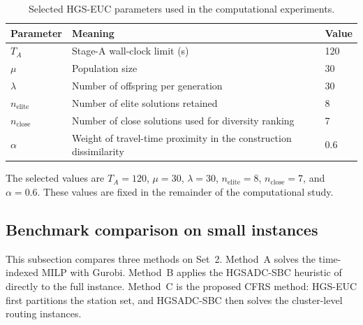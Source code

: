 \begin{table}[t]
  \centering
  \caption{Selected HGS-EUC parameters used in the computational experiments.}
  \label{tab:stage-a-params}
  \begin{tabular}{lll}
    \toprule
    Parameter & Meaning & Value \\
    \midrule
    $T_A$ & Stage-A wall-clock limit (s) & 120 \\
    $\mu$ & Population size & 30 \\
    $\lambda$ & Number of offspring per generation & 30 \\
    $n_{\mathrm{elite}}$ & Number of elite solutions retained & 8 \\
    $n_{\mathrm{close}}$ & Number of close solutions used for diversity ranking & 7 \\
    $\alpha$ & Weight of travel-time proximity in the construction dissimilarity & 0.6 \\
    \bottomrule
  \end{tabular}
\end{table}

The selected values are $T_A=120$, $\mu=30$, $\lambda=30$,
$n_{\mathrm{elite}}=8$, $n_{\mathrm{close}}=7$, and $\alpha=0.6$. These values
are fixed in the remainder of the computational study.

\subsection{Benchmark comparison on small instances}\label{sec:exp-small-benchmark}\label{sec:exp-w2}

This subsection compares three methods on Set~2. Method~A solves the
time-indexed MILP with Gurobi. Method~B applies the HGSADC-SBC heuristic of
\citet{huRepositioningBikeSharing2025} directly to the full instance. Method~C
is the proposed CFRS method: HGS-EUC first partitions the station set, and
HGSADC-SBC then solves the cluster-level routing instances.

